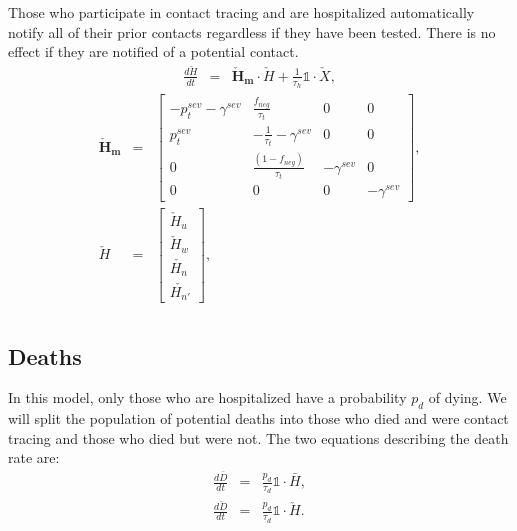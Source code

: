 \documentclass[notitlepage, superscriptaddress]{revtex4-2}
\begin{document}
Those who participate in contact tracing and are hospitalized automatically notify all of their prior contacts regardless if they have been tested. There is no effect if they are notified of a potential contact.
\begin{eqnarray}
\frac{d\check{H}}{dt} &=& \boldsymbol{\check{H}_{m}} \cdot \check{H} + \frac{1}{\tau_{h}} \mathbb{1} \cdot  \check{X}, 
\end{eqnarray}
%
\begin{eqnarray}
\boldsymbol{\check{H}_{m}} &=&
\begin{bmatrix}
 - p^{sev}_{t} - \gamma^{sev} & \frac{f_{neg}}{\tau_{t}}  & 0 & 0 \\
p^{sev}_{t}  & -\frac{1}{\tau_{t}} - \gamma^{sev}      &  0    & 0  \\
 0 & \frac{(1-f_{neg})}{\tau_{t}}  & - \gamma^{sev}  & 0 \\ 
0 & 0 & 0 & - \gamma^{sev}
\end{bmatrix}, \\ 
%
\check{H} &=& 
\begin{bmatrix}
\check{H}_{u} \\  \check{H}_{w}\\ \check{H_{n}} \\ \check{H_{n'}}
\end{bmatrix}, \\ 
%
\end{eqnarray}
% 

\subsection{Deaths}
In this model, only those who are hospitalized have a probability $p_{d}$ of dying. We will split the population of potential deaths into those who died and were contact tracing and those who died but were not. The two equations describing the death rate are:
\begin{eqnarray}
\frac{d\bar{D}}{dt} &=& \frac{p_{d}}{\tau_{d}} \mathbb{1} \cdot \bar{H}, \\ 
\frac{d\check{D}}{dt} &=& \frac{p_{d}}{\tau_{d}} \mathbb{1} \cdot \check{H}.
\end{eqnarray}
\end{document}

